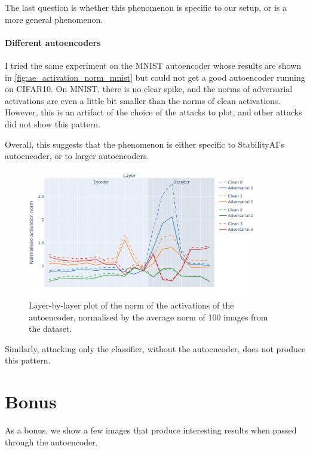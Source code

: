 \documentclass[]{scrarticle}
\begin{document}
The last question is whether this phenomenon is specific to
our setup, or is a more general phenomenon.

\paragraph{Different autoencoders}
I tried the same experiment on the MNIST autoencoder
whose results are shown in
\autoref{fig:ae_activation_norm_mnist}
but could not get a good autoencoder running on CIFAR10.
On MNIST, there is no clear spike, and the norms of adversarial
activations are even a little bit smaller than the norms of clean activations.
However, this is an artifact of the choice of the attacks to plot,
and other attacks did not show this pattern.

Overall, this suggests that the phenomenon is either specific
to StabilityAI's autoencoder, or to larger autoencoders.

\begin{figure}[h]
  \centering
  \includegraphics[width=0.9\textwidth]{../images/ae_activation_norm_MNIST.png}
  \caption{
    Layer-by-layer plot of the norm of the activations of the autoencoder,
    normalised by the average norm of 100 images from the dataset.
  }
  \label{fig:ae_activation_norm_mnist}
\end{figure}


Similarly, attacking only the classifier, without the autoencoder,
does not produce this pattern.

\clearpage
\section*{Bonus}

As a bonus, we show a few images that produce interesting results when
passed through the autoencoder.
\end{document}
